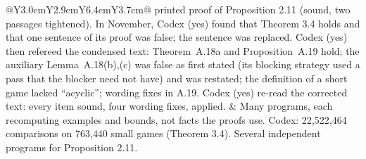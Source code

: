\begin{table}[!htbp]
\begin{tabular}{@{}Y{3.0cm}Y{2.9cm}Y{6.4cm}Y{3.7cm}@{}}
printed proof of Proposition 2.11 (sound, two passages tightened). In November, Codex (yes) found that Theorem 3.4 holds and
that one sentence of its proof was false; the sentence was replaced.
Codex (yes) then refereed the condensed text: Theorem~A.18a and Proposition~A.19 hold; the auxiliary Lemma~A.18(b),(c) was false as first stated (its blocking strategy used a pass that the blocker need not have) and was restated; the definition of a short game lacked ``acyclic''; wording fixes in A.19. Codex (yes) re-read the corrected text: every item sound, four wording fixes, applied.
&
Many programs, each recomputing examples and bounds, not facts the proofs use. Codex: 22{,}522{,}464 comparisons on
763{,}440 small games (Theorem 3.4). Several independent programs for Proposition 2.11.\\
\bottomrule
\end{tabular}
\end{table}

